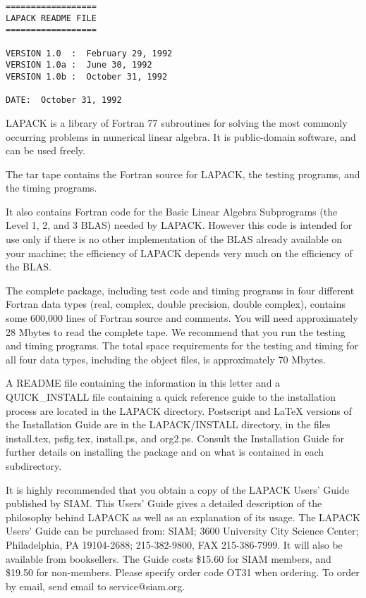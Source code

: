 \begin{verbatim}
==================
LAPACK README FILE
==================

VERSION 1.0  :  February 29, 1992
VERSION 1.0a :  June 30, 1992
VERSION 1.0b :  October 31, 1992

DATE:  October 31, 1992
\end{verbatim}

LAPACK is a library of Fortran 77 subroutines for solving
the most commonly occurring problems in numerical linear algebra.
It is public-domain software, and can be used freely.

The tar tape contains the Fortran source for LAPACK, the testing programs, and
the timing programs.

It also contains Fortran code for the Basic Linear Algebra Subprograms
(the Level 1, 2, and 3 BLAS) needed by LAPACK.
However this code is intended for use only if there is no other implementation
of the BLAS already available on your machine; the efficiency of LAPACK
depends very much on the efficiency of the BLAS.

The complete package, including test code and timing programs in four
different Fortran data types (real, complex, double precision, double
complex), contains some 600,000 lines of Fortran source and comments.
You will need approximately 28 Mbytes to read the complete tape.
We recommend that you run the testing and timing programs.
The total space requirements for the testing and timing for all four data
types, including the object files, is approximately 70 Mbytes.

A README file containing the information in this letter and a
QUICK\_INSTALL file containing a quick reference guide to the
installation process are located in the LAPACK directory.
Postscript and LaTeX versions of the Installation
Guide are in the LAPACK/INSTALL directory, in the files install.tex,
psfig.tex, install.ps, and org2.ps.  Consult the Installation Guide
for further details on installing the package and on what is contained
in each subdirectory.

It is highly recommended that you obtain a copy of the LAPACK
Users' Guide published by SIAM.  This Users' Guide gives a detailed
description of the philosophy behind LAPACK as well as an explanation of
its usage.  The LAPACK Users' Guide can be purchased from:
SIAM; 3600 University City Science Center; Philadelphia, PA 19104-2688;
215-382-9800, FAX 215-386-7999.  It will also be available from booksellers.
The Guide costs \$15.60 for SIAM members, and \$19.50 for non-members.
Please specify order code OT31 when ordering.  To order by email, send
email to service@siam.org.


